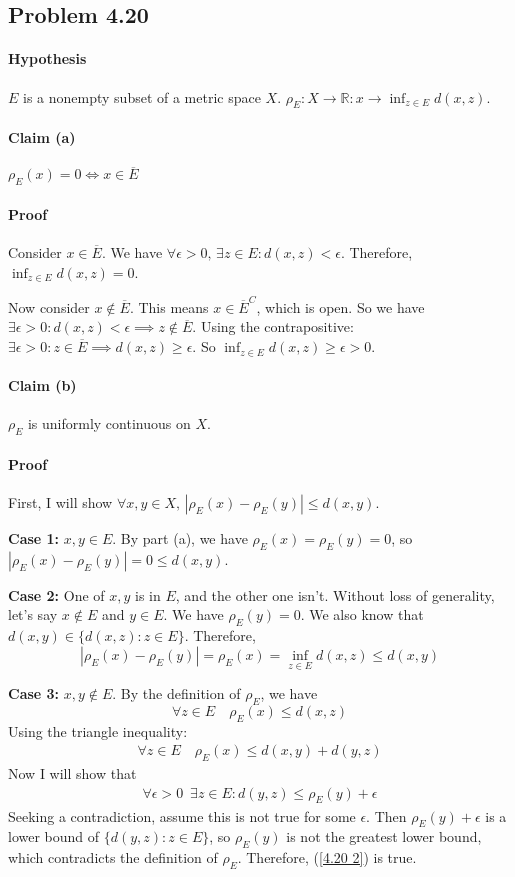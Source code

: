 \documentclass[11pt,letterpaper]{article}
\begin{document}
\subsection*{Problem 4.20}
\paragraph{Hypothesis} $E$ is a nonempty subset of a metric space $X$. $\rho_E : X \rightarrow \mathbb{R} : x \rightarrow \inf_{z \in E}d(x,z)$.
\paragraph{Claim (a)} $\rho_E(x)=0 \iff x \in \overline{E}$ 
\paragraph{Proof} Consider $x \in \overline{E}$. We have $\forall\epsilon>0,\, \exists z \in E : d(x,z)<\epsilon$. Therefore, $\inf_{z \in E}d(x,z) = 0$.

Now consider $x \notin \overline{E}$. This means $x \in \overline{E}^C$, which is open. So we have $\exists\epsilon>0 : d(x,z)<\epsilon \implies z \notin \overline{E}$. Using the contrapositive: $\exists\epsilon>0 : z \in \overline{E} \implies d(x,z)\geq\epsilon$. So $\inf_{z \in E}d(x,z) \geq \epsilon > 0$.

\paragraph{Claim (b)} $\rho_E$ is uniformly continuous on $X$. 
\paragraph{Proof} First, I will show $\forall x,y \in X,\, |\rho_E(x)-\rho_E(y)| \leq d(x,y)$. 

\textbf{Case 1:} $x,y \in E$. By part (a), we have $\rho_E(x)=\rho_E(y)=0$, so $|\rho_E(x)-\rho_E(y)|=0 \leq d(x,y)$.

\textbf{Case 2:} One of $x,y$ is in $E$, and the other one isn't. Without loss of generality, let's say $x \notin E$ and $y \in E$. We have $\rho_E(y)=0$. We also know that $d(x,y) \in \{d(x,z) : z \in E\}$. Therefore,
\[ |\rho_E(x)-\rho_E(y)| = \rho_E(x) = \inf_{z \in E}d(x,z) \leq d(x,y) \]

\textbf{Case 3:} $x,y \notin E$. By the definition of $\rho_E$, we have
\[ \forall z \in E \quad \rho_E(x) \leq d(x,z)  \]
Using the triangle inequality:
\begin{align}\label{4.20 1} \forall z \in E \quad \rho_E(x) \leq d(x,y) + d(y,z) \end{align}
Now I will show that 
\begin{align}\label{4.20 2} \forall\epsilon>0 \,\,\, \exists z \in E : d(y,z) \leq \rho_E(y) + \epsilon \end{align}
Seeking a contradiction, assume this is not true for some $\epsilon$. Then $\rho_E(y) + \epsilon$ is a lower bound of $\{d(y,z) : z \in E\}$, so $\rho_E(y)$ is not the greatest lower bound, which contradicts the definition of $\rho_E$. Therefore, (\ref{4.20 2}) is true. 
\end{document}
